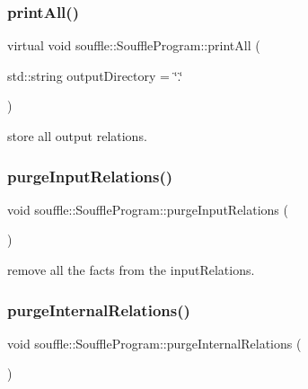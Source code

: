 \subsubsection{\texorpdfstring{print\+All()}{printAll()}}
{\footnotesize\ttfamily virtual void souffle\+::\+Souffle\+Program\+::print\+All (\begin{DoxyParamCaption}\item[{std\+::string}]{output\+Directory = {\ttfamily \char`\"{}.\char`\"{}} }\end{DoxyParamCaption})\hspace{0.3cm}{\ttfamily [pure virtual]}}

store all output relations. \mbox{\label{classsouffle_1_1_souffle_program_a187e2e268f57646919069ed681dd0bab}} 
\subsubsection{\texorpdfstring{purge\+Input\+Relations()}{purgeInputRelations()}}
{\footnotesize\ttfamily void souffle\+::\+Souffle\+Program\+::purge\+Input\+Relations (\begin{DoxyParamCaption}{ }\end{DoxyParamCaption})\hspace{0.3cm}{\ttfamily [inline]}}

remove all the facts from the input\+Relations. \mbox{\label{classsouffle_1_1_souffle_program_a6fd5245fc40fd948060be332fe60debf}} 
\subsubsection{\texorpdfstring{purge\+Internal\+Relations()}{purgeInternalRelations()}}
{\footnotesize\ttfamily void souffle\+::\+Souffle\+Program\+::purge\+Internal\+Relations (\begin{DoxyParamCaption}{ }\end{DoxyParamCaption})\hspace{0.3cm}{\ttfamily [inline]}}

